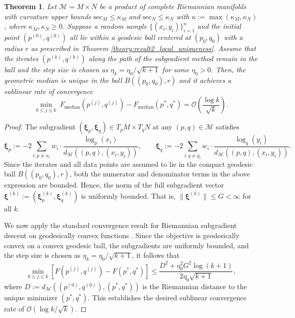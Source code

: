 \documentclass[10pt]{article}
\newtheorem{theorem}{Theorem}[section]
\newcommand{\calM}{\mathcal{M}}
\newcommand{\calO}{\mathcal{O}}
\begin{document}
\begin{theorem}\label{theory:convergence_subgradient}
Let $\calM=M\times N$ be a product of complete Riemannian manifolds with curvature upper bounds $\text{sec}_M \leq \kappa_M$ and 
$\text{sec}_N \leq \kappa_N$ with  $\kappa := \max(\kappa_M, \kappa_N)$, where $\kappa_M, \kappa_N \ge 0$. Suppose a random sample $\lbrace (x_i, y_i)\rbrace_{i=1}^n$ and the initial point $(p^{(0)}, q^{(0)})$ all lie within a geodesic ball centered at $(p_0,q_0)$ with a radius $r$ as prescribed in Theorem \ref{theory:result2_local_uniqueness}. Assume that the iterates $(p^{(k)}, q^{(k)})$ along the path of the subgradient method remain in the ball and the step size is chosen as $\eta_k = \eta_0/\sqrt{k+1}$ for some $\eta_0 > 0$. Then, the geometric median is unique in the ball $B((p_0, q_0), r)$ and it achieves a sublinear rate of convergence
\begin{equation*}
	\underset{0\leq j\leq k}{\min}~ F_{\text{median}}(p^{(j)}, q^{(j)}) - F_\text{median}(p^*, q^*) = \mathcal{O}\left(\frac{\log k}{\sqrt{k}}\right).
\end{equation*}
\end{theorem}
\begin{proof}
The subgradient \((\boldsymbol{\xi}_p, \boldsymbol{\xi}_q) \in T_p M \times T_q N\) at any \((p, q) \in \calM\) satisfies
\[
\boldsymbol{\xi}_p := -2 \sum_{i: p \ne x_i} w_i \cdot \frac{\log_p(x_i)}{d_\calM((p, q), (x_i, y_i))}, \qquad
\boldsymbol{\xi}_q := -2 \sum_{i: q \ne y_i} w_i \cdot \frac{\log_q(y_i)}{d_\calM((p, q), (x_i, y_i))}.
\]
Since the iterates and all data points are assumed to lie in the compact geodesic ball \(B((p_0, q_0), r)\), both the numerator and denominator terms in the above expression are bounded. Hence, the norm of the full subgradient vector \(\boldsymbol{\xi}^{(k)} := (\boldsymbol{\xi}_p^{(k)}, \boldsymbol{\xi}_q^{(k)})\) is uniformly bounded. That is, $\|\boldsymbol{\xi}^{(k)}\| \le G < \infty$ for all $k$.

We now apply the standard convergence result for Riemannian subgradient descent on geodesically convex functions \citep{zhang_2016_FirstorderMethodsGeodesically}. Since the objective is geodesically convex on a convex geodesic ball, the subgradients are uniformly bounded, and the step size is chosen as \(\eta_k = \eta_0 / \sqrt{k+1}\), 
it follows that
\[
\min_{0 \le j \le k} \left[ F(p^{(j)}, q^{(j)}) - F(p^*, q^*) \right] \le \frac{D^2 + \eta_0^2 G^2 \log(k+1)}{2 \eta_0 \sqrt{k+1}},
\]
where \(D := d_\calM((p^{(0)}, q^{(0)}), (p^*, q^*))\) is the Riemannian distance to the unique minimizer \((p^*, q^*)\). This establishes the desired sublinear convergence rate of  $\calO(\log k/\sqrt{k})$.
\end{proof}
\end{document}
